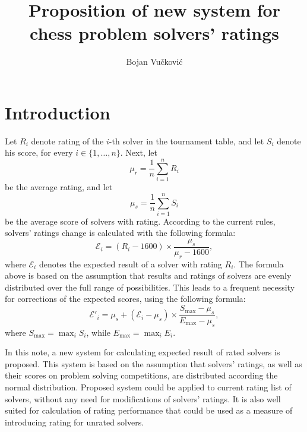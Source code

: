 \documentclass[preprint,12pt]{article}
\newcommand{\ch}{\v{c}}
\newcommand{\tj}{\'c}
\newcommand{\E}{\mathcal{E}}
\begin{document}
\begin{titlepage}
\title{
	{Proposition of new system for chess problem solvers' ratings}
	}
\author{Bojan Vu\ch kovi\tj}
\end{titlepage}




\maketitle

\section{Introduction}

Let $R_i$ denote rating of the $i$-th solver in the tournament table,
and let $S_i$ denote his score, for every $i \in \{1,\dots,n\}$.
Next, let
\begin{equation}\label{mu_r}
\mu_r = \frac{1}{n}\sum_{i=1}^n R_i
\end{equation}
be the average rating, and let
\begin{equation}\label{mu_s}
\mu_s = \frac{1}{n}\sum_{i=1}^n S_i
\end{equation}
be the average score of solvers with rating.
According to the current rules, solvers' ratings change is
calculated with the following formula:
$$\E_i = (R_i-1600) \times \frac{\mu_s}{\mu_r-1600},$$
where $\E_i$ denotes the expected result of a solver with rating $R_i$.
The formula above is based on the assumption that results
and ratings of solvers are evenly distributed over the full range of possibilities.
This leads to a frequent necessity for corrections of the expected scores,
using the following formula:
\begin{equation}\label{old_corrected_system}
\E'_i = \mu_s +
(\E_i-\mu_s) \times \frac{S_{\max} - \mu_s}{E_{\max}-\mu_s},
\end{equation}
where $S_{\max} = \max_i S_i$, while $E_{\max} = \max_i E_i$.

In this note, a new system for calculating expected result of
rated solvers is proposed.
This system is based on the assumption that solvers' ratings,
as well as their scores on problem solving competitions,
are distributed according the normal distribution.
Proposed system could be applied to current rating list of solvers,
without any need for modifications of solvers' ratings.
It is also well suited for calculation of rating performance
that could be used as a measure of introducing rating for unrated solvers.
\end{document}
